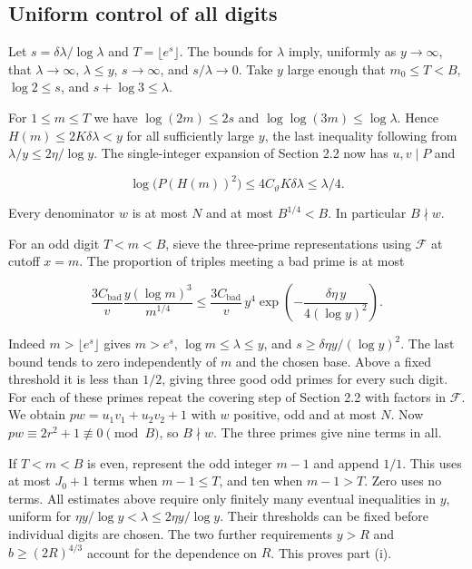 \documentclass[11pt,a4paper]{article}
\begin{document}
\subsection{Uniform control of all digits}

Let $s=\delta\lambda/\log\lambda$ and $T=\lfloor e^s\rfloor$. The bounds for $\lambda$ imply, uniformly as $y\to\infty$, that $\lambda\to\infty$, $\lambda\le y$, $s\to\infty$, and $s/\lambda\to0$. Take $y$ large enough that $m_0\le T<B$, $\log2\le s$, and $s+\log3\le\lambda$.

For $1\le m\le T$ we have $\log(2m)\le2s$ and $\log\log(3m)\le\log\lambda$. Hence $H(m)\le2K\delta\lambda<y$ for all sufficiently large $y$, the last inequality following from $\lambda/y\le2\eta/\log y$. The single-integer expansion of Section 2.2 now has $u,v\mid P$ and

\[
\log\big(P(H(m))^2\big)\le4C_\vartheta K\delta\lambda\le\lambda/4 .
\]

Every denominator $w$ is at most $N$ and at most $B^{1/4}<B$. In particular $B\nmid w$.

For an odd digit $T<m<B$, sieve the three-prime representations using $\mathcal F$ at cutoff $x=m$. The proportion of triples meeting a bad prime is at most

\[
\frac{3C_{\mathrm{bad}}}{v}\frac{y(\log m)^3}{m^{1/4}}
\le \frac{3C_{\mathrm{bad}}}{v}\,y^4
    \exp\!\left(-\frac{\delta\eta\,y}{4(\log y)^2}\right).
\]

Indeed $m>\lfloor e^s\rfloor$ gives $m>e^s$, $\log m\le\lambda\le y$, and $s\ge\delta\eta y/(\log y)^2$. The last bound tends to zero independently of $m$ and the chosen base. Above a fixed threshold it is less than $1/2$, giving three good odd primes for every such digit. For each of these primes repeat the covering step of Section 2.2 with factors in $\mathcal F$. We obtain $p w=u_1v_1+u_2v_2+1$ with $w$ positive, odd and at most $N$. Now $pw\equiv2r^2+1\not\equiv0\pmod B$, so $B\nmid w$. The three primes give nine terms in all.

If $T<m<B$ is even, represent the odd integer $m-1$ and append $1/1$. This uses at most $J_0+1$ terms when $m-1\le T$, and ten when $m-1>T$. Zero uses no terms. All estimates above require only finitely many eventual inequalities in $y$, uniform for $\eta y/\log y<\lambda\le2\eta y/\log y$. Their thresholds can be fixed before individual digits are chosen. The two further requirements $y>R$ and $b\ge(2R)^{4/3}$ account for the dependence on $R$. This proves part (i).
\end{document}
